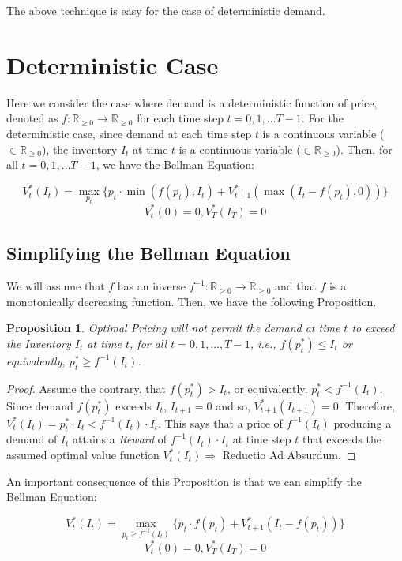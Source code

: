 \documentclass[12pt]{amsart}
\newtheorem{prop}{Proposition}
\begin{document}
   The above technique is easy for the case of deterministic demand.
   
   \section{Deterministic Case}
   Here we consider the case where demand is a deterministic function of price, denoted as $f : \mathbb{R}_{\geq 0} \rightarrow \mathbb{R}_{\geq 0}$ for each time step $t = 0, 1, \ldots T-1$. For the deterministic case, since demand at each time step $t$ is a continuous variable ($\in \mathbb{R}_{\geq 0}$), the inventory $I_t$ at time $t$ is a continuous variable ($\in \mathbb{R}_{\geq 0}$). Then, for all $t = 0, 1, \ldots T - 1$, we have the Bellman Equation:
   
   $$V_t^*(I_t) = \max_{p_t} \{ p_t \cdot \min(f(p_t), I_t) + V_{t+1}^*(\max(I_t - f(p_t), 0)) \}$$
   $$V_t^*(0) = 0,  V_T^*(I_T) = 0$$
  
  \subsection{Simplifying the Bellman Equation}
  We will assume that $f$ has an inverse $f^{-1} : \mathbb{R}_{\geq 0} \rightarrow \mathbb{R}_{\geq 0}$ and that $f$ is a monotonically decreasing function. Then, we have the following Proposition.
  \begin{prop}
  Optimal Pricing will not permit the demand at time $t$ to exceed the Inventory $I_t$ at time $t$, for all $t = 0, 1, \ldots, T-1$, i.e., $f(p_t^*) \leq I_t$ or equivalently, $p_t^* \geq f^{-1}(I_t)$.
  \end{prop}
  \begin{proof}
  Assume the contrary, that $f(p_t^*) > I_t$, or equivalently, $p_t^* < f^{-1}(I_t)$. Since demand $f(p_t^*)$ exceeds $I_t$, $I_{t+1} = 0$ and so, $V_{t+1}^*(I_{t+1}) = 0$. Therefore, $V_t^*(I_t) = p_t^* \cdot I_t < f^{-1}(I_t) \cdot I_t$. This says that a price of $f^{-1}(I_t)$ producing a demand of $I_t$ attains a {\em Reward} of  $f^{-1}(I_t) \cdot I_t$ at time step $t$ that exceeds the assumed optimal value function $V_t^*(I_t) \Rightarrow $ Reductio Ad Absurdum.
  \end{proof}
  
  An important consequence of this Proposition is that we can simplify the Bellman Equation:
  
  $$V_t^*(I_t) = \max_{p_t \geq f^{-1}(I_t)} \{ p_t \cdot f(p_t) + V_{t+1}^*(I_t - f(p_t)) \}$$
   $$V_t^*(0) = 0,  V_T^*(I_T) = 0$$
\end{document}
